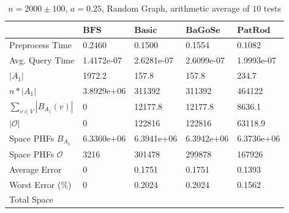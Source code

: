 \documentclass[shortabstract, lic, english]{iithesis}
\theoremstyle{definition} \newtheorem{definition}{Definition}[chapter]
\theoremstyle{remark} \newtheorem{remark}[definition]{Observation}
\theoremstyle{plain} \newtheorem{theorem}[definition]{Theorem}
\theoremstyle{plain} \newtheorem{lemma}[definition]{Lemma}
\theoremstyle{plain} \newtheorem{conjecture}[definition]{Conjecture}
\begin{document}
\begin{table}[H] \label{test:random.a0.25}
    \centering
    \begin{tabular}{ |p{3cm}||p{2cm}|p{2cm}|p{2cm}|p{2cm}|  } 
        \hline
        & $\mathbf{BFS}$ & $\mathbf{Basic}$ & $\mathbf{BaGoSe}$ & $\mathbf{PatRod}$ \\
        \hline
        \hline
        Preprocess Time                 & 0.2460     & 0.1500     & 0.1554      & 0.1082     \\
        \hline
        Avg. Query Time                 & 1.4172e-07 & 2.6281e-07 & 2.6099e-07  & 1.9993e-07 \\
        \hline
        $|A_1|$                         & 1972.2     & 157.8      & 157.8       & 234.7      \\
        \hline
        $n * |A_1|$                     & 3.8929e+06 & 311392     & 311392      & 464122     \\
        \hline
        $\sum_{v \in V} |B_{A_1}(v)| $  & 0          & 12177.8    & 12177.8     & 8636.1     \\
        \hline
        $|\mathcal{O}|$                 & 0          & 122816     & 122816      & 63118.9    \\
        \hline
        Space PHFs $B_{A_1}$            & 6.3360e+06 & 6.3941e+06 & 6.3942e+06  & 6.3736e+06 \\
        \hline
        Space PHFs $\mathcal{O}$        & 3216       & 301478     & 299878      & 167926     \\
        \hline
        Average Error                   & 0          & 0.1751     & 0.1751      & 0.1393     \\
        \hline
        Worst Error (\%)                & 0          & 0.2024     & 0.2024      & 0.1562     \\
        \hline
        Total Space                     &            &            &             &            \\
        \hline

    \end{tabular}
    \caption{$n = 2000 \pm 100$, $a = 0.25$, Random Graph, arithmetic average of $10$ tests}
\end{table}
\end{document}
